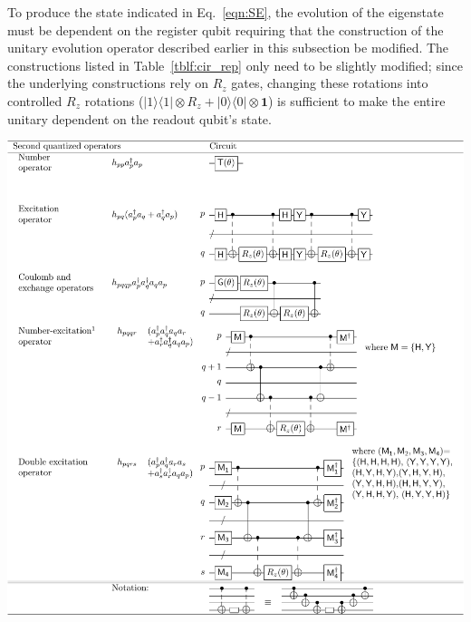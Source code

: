 \documentclass[11pt,oneside,final]{huthesis}%
\begin{document}
To produce the state indicated in Eq.~\eqref{eqn:SE}, the evolution of the eigenstate must be dependent on the register qubit requiring that the construction of the unitary evolution operator described earlier in this subsection be modified. The constructions listed in {Table}~\ref{tblf:cir_rep} only need to be slightly modified; since the underlying constructions rely on $R_z$ gates, changing these rotations into controlled $R_z$ rotations ($|1\rangle\langle 1|\otimes R_z+|0\rangle\langle 0|\otimes \mathbf{1}$) is sufficient to make the entire unitary dependent on the readout qubit's state.
\begin{table}[ht]
\includegraphics[width=.95\textwidth]{./figures/gate-table}

\end{table}
\end{document}
